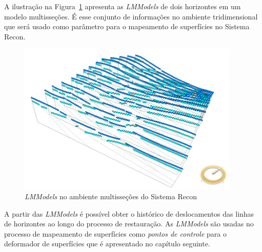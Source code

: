A ilustração na Figura~\ref{fig-lmmodel-ms} apresenta as \textit{LMModels} de dois horizontes em um modelo multisseções. É esse conjunto de informações no ambiente tridimensional que será usado como parâmetro para o mapeamento de superfícies no Sistema Recon.

\begin{figure} [h!]
  \begin{center}
    \includegraphics[width=300pt]{images/fig-lmmodel-ms}
    \caption{\textit{LMModels} no ambiente multisseções do Sistema Recon}\label{fig-lmmodel-ms}
  \end{center}
\end{figure}

A partir das \emph{LMModels} é possível obter o histórico de deslocamentos das linhas de horizontes ao longo do processo de restauração. As \emph{LMModels} são usadas no processo de mapeamento de superfícies como \emph{pontos de controle} para o deformador de superfícies que é apresentado no capítulo seguinte.


